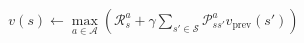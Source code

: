\documentclass[preview]{standalone}
\begin{document}
\begin{align*}
v(s) \leftarrow \max_{a \in \mathcal{A}} \left(\mathcal{R}_s^a + \gamma \sum_{s' \in \mathcal{S}} \mathcal{P}_{ss'}^a v_{\text{prev}}(s')\right)
\end{align*}
\end{document}
